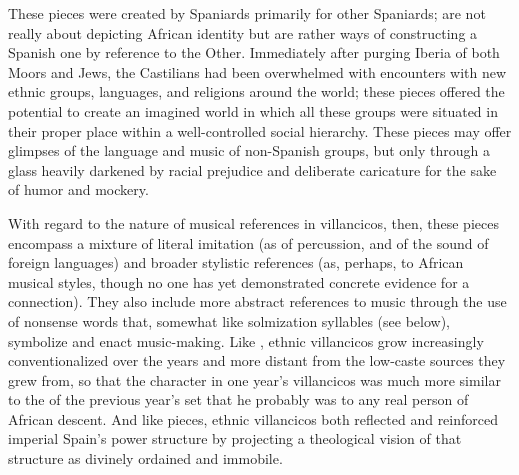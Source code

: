 These pieces were created by Spaniards primarily for other Spaniards;
 are not really about depicting African identity but
are rather ways of constructing a Spanish one by reference to the Other.
Immediately after purging Iberia of both Moors and Jews, the Castilians had
been overwhelmed with encounters with new ethnic groups, languages, and
religions around the world; these pieces offered the potential to create an
imagined world in which all these groups were situated in their proper place
within a well-controlled social hierarchy.
These pieces may offer glimpses of the language and music of non-Spanish
groups, but only through a glass heavily darkened by racial prejudice and
deliberate caricature for the sake of humor and mockery.

With regard to the nature of musical references in 
villancicos, then, these pieces encompass a mixture of literal imitation (as of
percussion, and of the  sound of foreign languages) and
broader stylistic references (as, perhaps, to African musical styles, though no
one has yet demonstrated concrete evidence for a connection).
They also include more abstract references to music through the use of nonsense
words that, somewhat like solmization syllables (see below), symbolize and
enact music-making.
Like , ethnic villancicos grow increasingly conventionalized over
the years and more distant from the low-caste sources they grew from, so that
the  character in one year's villancicos was much more similar to
the  of the previous year's set that he probably was to any real
person of African descent.
And like  pieces, ethnic villancicos both reflected and reinforced
imperial Spain's power structure by projecting a theological vision of that
structure as divinely ordained and immobile.

